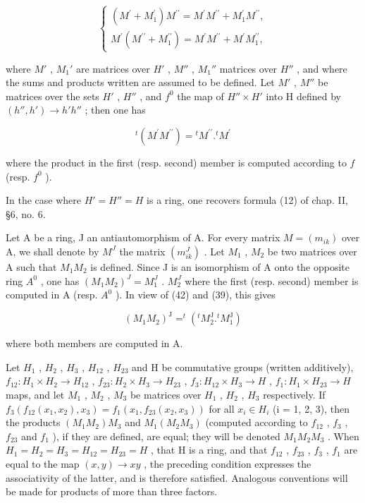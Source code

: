 \[
\left\{ \begin{array}{l} (M ^ {\prime} + M _ {1} ^ {\prime}) M ^ {\prime \prime} = M ^ {\prime} M ^ {\prime \prime} + M _ {1} ^ {\prime} M ^ {\prime \prime}, \\ M ^ {\prime} (M ^ {\prime \prime} + M _ {1} ^ {\prime \prime}) = M ^ {\prime} M ^ {\prime \prime} + M ^ {\prime} M _ {1} ^ {\prime \prime}, \end{array} \right.\tag{41}
\]

where \(M'\) , \(M_1'\) are matrices over \(H'\) , \(M''\) , \(M_1''\) matrices over \(H''\) , and where the sums and products written are assumed to be defined. Let \(M'\) , \(M''\) be matrices over the sets \(H'\) , \(H''\) , and \(f^0\) the map of \(H'' \times H'\) into H defined by \((h'', h') \to h' h''\) ; then one has

\[
{ } ^ { t } ( M ^ { \prime } M ^ { \prime \prime } ) = { } ^ { t } M ^ { \prime \prime } . { } ^ { t } M ^ { \prime }\tag{42}
\]

where the product in the first (resp. second) member is computed according to \(f\) (resp. \(f^{0}\) ).

In the case where \(H' = H'' = H\) is a ring, one recovers formula (12) of chap. II, §6, no. 6.

Let A be a ring, J an antiautomorphism of A. For every matrix \(M = (m_{ik})\) over A, we shall denote by \(M^{J}\) the matrix \((m_{ik}^{J})\) . Let \(M_{1}\) , \(M_{2}\) be two matrices over A such that \(M_{1}M_{2}\) is defined. Since J is an isomorphism of A onto the opposite ring \(A^{0}\) , one has \((M_{1}M_{2})^{J} = M_{1}^{J}\) . \(M_{2}^{J}\) where the first (resp. second) member is computed in A (resp. \(A^{0}\) ). In view of (42) and (39), this gives

\[
(M _ {1} M _ {2}) ^ {\mathrm{J}} = ^ {t} (^ {t} M _ {2} ^ {\mathrm{J}}. ^ {t} M _ {1} ^ {\mathrm{J}})\tag{43}
\]

where both members are computed in A.

Let \(H_{1}\) , \(H_{2}\) , \(H_{3}\) , \(H_{12}\) , \(H_{23}\) and H be commutative groups (written additively), \(f_{12}: H_{1} \times H_{2} \to H_{12}\) , \(f_{23}: H_{2} \times H_{3} \to H_{23}\) , \(f_{3}: H_{12} \times H_{3} \to H\) , \(f_{1}: H_{1} \times H_{23} \to H\) maps, and let \(M_{1}\) , \(M_{2}\) , \(M_{3}\) be matrices over \(H_{1}\) , \(H_{2}\) , \(H_{3}\) respectively. If \(f_{3}(f_{12}(x_{1}, x_{2}), x_{3}) = f_{1}(x_{1}, f_{23}(x_{2}, x_{3}))\) for all \(x_{i} \in H_{i}\) (i = 1, 2, 3), then the products \((M_{1}M_{2})M_{3}\) and \(M_{1}(M_{2}M_{3})\) (computed according to \(f_{12}\) , \(f_{3}\) , \(f_{23}\) and \(f_{1}\) ), if they are defined, are equal; they will be denoted \(M_{1}M_{2}M_{3}\) . When \(H_{1} = H_{2} = H_{3} = H_{12} = H_{23} = H\) , that H is a ring, and that \(f_{12}\) , \(f_{23}\) , \(f_{3}\) , \(f_{1}\) are equal to the map \((x, y) \to xy\) , the preceding condition expresses the associativity of the latter, and is therefore satisfied. Analogous conventions will be made for products of more than three factors.

